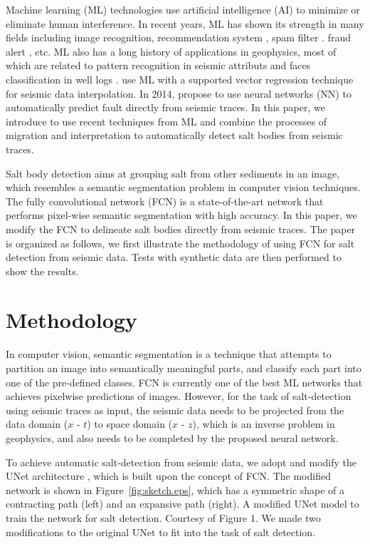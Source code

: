 \documentclass{segabs}
\begin{document}
Machine learning (ML) technologies use artificial intelligence (AI) to minimize or eliminate human interference. In recent years, ML has shown its strength in many fields including image recognition, recommendation system \citep{Bobadilla13}, spam filter \citep{Androutsopoulos00}. fraud alert \citep{Ravisankar11}, etc. ML also has a long history of applications in geophysics, most of which are related to pattern recognition in seismic attributs  \citep{zeng04,zhao15} and faces classification in well logs \citep{lim05,hall16}. \citet{jia17} use ML with a supported vector regression technique for seismic data interpolation. In 2014, \citet{zhang14} propose to use neural networks (NN) to automatically predict fault directly from seismic traces. In this paper, we introduce to use recent techniques from ML and combine the processes of migration and interpretation to automatically detect salt bodies from seismic traces. 

Salt body detection aims at grouping salt from other sediments in an image, which resembles a semantic segmentation problem in computer vision techniques. 
The fully convolutional network (FCN) \citep{long15} is a state-of-the-art network that performs pixel-wise semantic segmentation with high accuracy. In this paper, we modify the FCN to delineate salt bodies directly from seismic traces. The paper is organized as follows, we first illustrate the methodology of using FCN for salt detection from seismic data. Tests with synthetic data are then performed to show the results. 


\section{Methodology}
In computer vision, semantic segmentation is a technique that attempts to partition an image into semantically meaningful parts, and classify each part into one of the pre-defined classes. FCN is currently one of the best ML networks that achieves pixelwise predictions of images. However, for the task of salt-detection using seismic traces as input, the seismic data needs to be projected from the data domain ($x$ - $t$) to space domain ($x$ - $z$), which is an inverse problem in geophysics, and also needs to be completed by the proposed neural network.

To achieve automatic salt-detection from seismic data, we adopt and modify the UNet architecture \citep{ronneberger15}, which is built upon the concept of FCN. The modified network is shown in Figure~\ref{fig:sketch.eps}, which has a symmetric shape of a contracting path (left) and an expansive path (right).
{A modified UNet model to train the network for salt detection. Courtesy of \citet{ronneberger15} Figure 1.}
We made two modifications to the original UNet to fit into the task of salt detection. 
\end{document}
